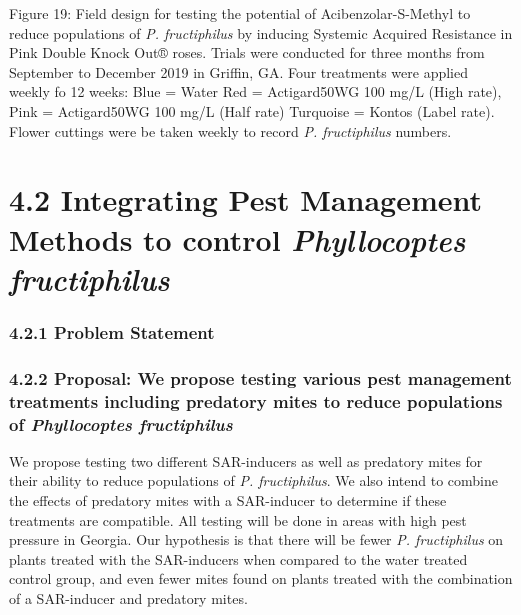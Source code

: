 \documentclass[12pt,final,CPage]{ufthesis}
\begin{document}
{  Figure 19: Field design for testing the potential of Acibenzolar-S-Methyl to reduce populations of \emph{P. fructiphilus} by inducing Systemic Acquired Resistance in Pink Double Knock Out® roses. Trials were conducted for three months from September to December 2019 in Griffin, GA. Four treatments were applied weekly fo 12 weeks: Blue = Water Red = Actigard50WG 100 mg/L (High rate), Pink = Actigard50WG 100 mg/L (Half rate) Turquoise = Kontos (Label rate). Flower cuttings were be taken weekly to record \emph{P. fructiphilus} numbers.

  \hypertarget{ipm-trials}{%
  \section{\texorpdfstring{4.2 Integrating Pest Management Methods to control \emph{Phyllocoptes fructiphilus}}{4.2 Integrating Pest Management Methods to control Phyllocoptes fructiphilus}}\label{ipm-trials}}

  \hypertarget{problem-statement-2}{%
  \subsubsection{4.2.1 Problem Statement}\label{problem-statement-2}}

  \hypertarget{proposal-we-propose-testing-various-pest-management-treatments-including-predatory-mites-to-reduce-populations-of-phyllocoptes-fructiphilus}{%
  \subsubsection{\texorpdfstring{4.2.2 Proposal: We propose testing various pest management treatments including predatory mites to reduce populations of \emph{Phyllocoptes fructiphilus}}{4.2.2 Proposal: We propose testing various pest management treatments including predatory mites to reduce populations of Phyllocoptes fructiphilus}}\label{proposal-we-propose-testing-various-pest-management-treatments-including-predatory-mites-to-reduce-populations-of-phyllocoptes-fructiphilus}}

  We propose testing two different SAR-inducers as well as predatory mites for their ability to reduce populations of \emph{P. fructiphilus}. We also intend to combine the effects of predatory mites with a SAR-inducer to determine if these treatments are compatible. All testing will be done in areas with high pest pressure in Georgia. Our hypothesis is that there will be fewer \emph{P. fructiphilus} on plants treated with the SAR-inducers when compared to the water treated control group, and even fewer mites found on plants treated with the combination of a SAR-inducer and predatory mites.

}
\end{document}
